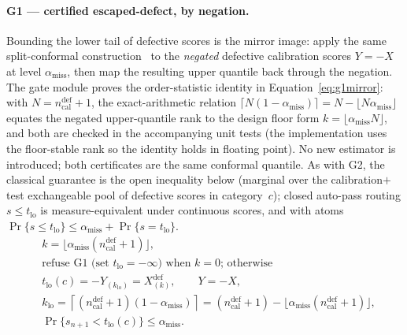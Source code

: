 \documentclass[preprint,11pt]{elsarticle}
\begin{document}
\paragraph{G1 --- certified escaped-defect, by negation.} Bounding the lower tail of defective
scores is the mirror image: apply the same split-conformal
construction~\citep{papadopoulos2002inductive} to the \emph{negated} defective calibration scores $Y=-X$ at level
$\alpha_{\text{miss}}$, then map the resulting upper quantile back through the negation. The gate
module proves the order-statistic identity in Equation~\eqref{eq:g1mirror}: with
$N=n_{\text{cal}}^{\text{def}}+1$, the exact-arithmetic relation
$\lceil N(1-\alpha_{\text{miss}})\rceil=N-\lfloor N\alpha_{\text{miss}}\rfloor$
equates the negated upper-quantile rank to the design floor form
$k=\lfloor\alpha_{\text{miss}}N\rfloor$, and both are checked in the accompanying unit tests
(the implementation uses the floor-stable rank so the identity holds in floating point). No new
estimator is introduced; both certificates are the same conformal quantile. As with G2, the
classical guarantee is the open inequality below (marginal over the calibration$+$test
exchangeable pool of defective scores in category~$c$); closed auto-pass routing
$s\le t_{\text{lo}}$ is measure-equivalent under continuous scores, and with atoms
$\Pr\{s\le t_{\text{lo}}\}\le\alpha_{\text{miss}}+\Pr\{s=t_{\text{lo}}\}$.
\begin{equation}
\begin{aligned}
&k=\bigl\lfloor\alpha_{\text{miss}}(n_{\text{cal}}^{\text{def}}+1)\bigr\rfloor ,\\
&\text{refuse G1 (set $t_{\text{lo}}=-\infty$) when $k=0$; otherwise}\\
&t_{\text{lo}}(c)=-Y_{(k_{\text{lo}})}=X^{\text{def}}_{(k)},\qquad
Y=-X,\\
&k_{\text{lo}}=\left\lceil (n_{\text{cal}}^{\text{def}}+1)
(1-\alpha_{\text{miss}})\right\rceil
= (n_{\text{cal}}^{\text{def}}+1)
-\bigl\lfloor\alpha_{\text{miss}}(n_{\text{cal}}^{\text{def}}+1)\bigr\rfloor ,\\[2pt]
&\Pr\!\bigl\{s_{n+1} < t_{\text{lo}}(c)\bigr\}
\le \alpha_{\text{miss}}.
\end{aligned}
\label{eq:g1mirror}
\end{equation}
\end{document}
